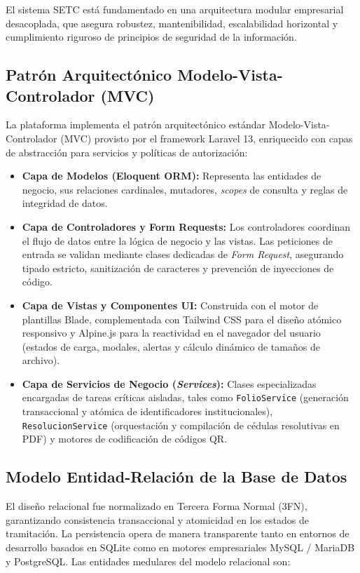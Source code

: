 El sistema SETC está fundamentado en una arquitectura modular empresarial desacoplada, que asegura robustez, mantenibilidad, escalabilidad horizontal y cumplimiento riguroso de principios de seguridad de la información.

\subsection{Patrón Arquitectónico Modelo-Vista-Controlador (MVC)}

La plataforma implementa el patrón arquitectónico estándar Modelo-Vista-Controlador (MVC) provisto por el framework Laravel 13, enriquecido con capas de abstracción para servicios y políticas de autorización:

\begin{itemize}
    \item \textbf{Capa de Modelos (Eloquent ORM):} Representa las entidades de negocio, sus relaciones cardinales, mutadores, \textit{scopes} de consulta y reglas de integridad de datos.
    \item \textbf{Capa de Controladores y Form Requests:} Los controladores coordinan el flujo de datos entre la lógica de negocio y las vistas. Las peticiones de entrada se validan mediante clases dedicadas de \textit{Form Request}, asegurando tipado estricto, sanitización de caracteres y prevención de inyecciones de código.
    \item \textbf{Capa de Vistas y Componentes UI:} Construida con el motor de plantillas Blade, complementada con Tailwind CSS para el diseño atómico responsivo y Alpine.js para la reactividad en el navegador del usuario (estados de carga, modales, alertas y cálculo dinámico de tamaños de archivo).
    \item \textbf{Capa de Servicios de Negocio (\textit{Services}):} Clases especializadas encargadas de tareas críticas aisladas, tales como \texttt{FolioService} (generación transaccional y atómica de identificadores institucionales), \texttt{ResolucionService} (orquestación y compilación de cédulas resolutivas en PDF) y motores de codificación de códigos QR.
\end{itemize}

\subsection{Modelo Entidad-Relación de la Base de Datos}

El diseño relacional fue normalizado en Tercera Forma Normal (3FN), garantizando consistencia transaccional y atomicidad en los estados de tramitación. La persistencia opera de manera transparente tanto en entornos de desarrollo basados en SQLite como en motores empresariales MySQL / MariaDB y PostgreSQL. Las entidades medulares del modelo relacional son:

